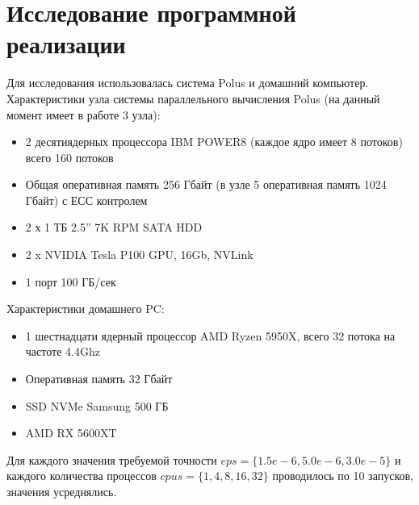 \documentclass{article}
\begin{document}
\section{Исследование программной реализации}
    Для исследования использовалась система Polus и домашний компьютер.
    Характеристики узла системы параллельного вычисления Polus (на данный момент имеет в работе 3 узла):
    \begin{itemize}
        \item 2 десятиядерных процессора IBM POWER8 (каждое ядро имеет 8 потоков) всего 160 потоков
        \item Общая оперативная память 256 Гбайт (в узле 5 оперативная память 1024 Гбайт) с ЕСС контролем
        \item 2 х 1 ТБ 2.5” 7K RPM SATA HDD
        \item 2 x NVIDIA Tesla P100 GPU, 16Gb, NVLink
        \item 1 порт 100 ГБ/сек
    \end{itemize}

    Характеристики домашнего PC:
    \begin{itemize}
        \item 1 шестнадцати ядерный процессор AMD Ryzen 5950X, всего 32 потока на частоте 4.4Ghz
        \item Оперативная память 32 Гбайт
        \item SSD NVMe Samsung 500 ГБ
        \item AMD RX 5600XT
    \end{itemize}

    Для каждого значения требуемой точности \(eps = \{1.5e-6, 5.0e-6, 3.0e-5\}\) 
    и каждого количества процессов \(cpus = \{1, 4, 8, 16, 32\}\) проводилось по 10 запусков,
    значения усреднялись.
\end{document}
